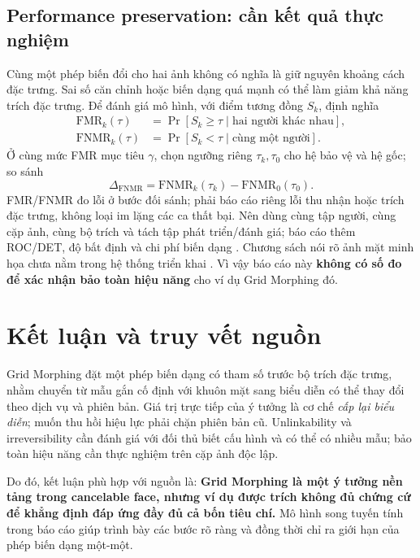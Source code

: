 \documentclass[11pt,a4paper]{article}
\begin{document}
\subsection{Performance preservation: cần kết quả thực nghiệm}
Cùng một phép biến đổi cho hai ảnh không có nghĩa là giữ nguyên khoảng cách đặc trưng. Sai số căn chỉnh hoặc biến dạng quá mạnh có thể làm giảm khả năng trích đặc trưng. Để đánh giá mô hình, với điểm tương đồng $S_k$, định nghĩa
\begin{align}
 \mathrm{FMR}_k(\tau)&=\Pr[S_k\geq\tau\mid\text{hai người khác nhau}],\\
 \mathrm{FNMR}_k(\tau)&=\Pr[S_k<\tau\mid\text{cùng một người}].
\end{align}
Ở cùng mức FMR mục tiêu $\gamma$, chọn ngưỡng riêng $\tau_k,\tau_0$ cho hệ bảo vệ và hệ gốc; so sánh
\begin{equation}
 \Delta_{\mathrm{FNMR}}=
 \mathrm{FNMR}_k(\tau_k)-\mathrm{FNMR}_0(\tau_0).
\end{equation}
FMR/FNMR đo lỗi ở bước đối sánh; phải báo cáo riêng lỗi thu nhận hoặc trích đặc trưng, không loại im lặng các ca thất bại. Nên dùng cùng tập người, cùng cặp ảnh, cùng bộ trích và tách tập phát triển/đánh giá; báo cáo thêm ROC/DET, độ bất định và chi phí biến dạng \cite{iso30136}. Chương sách nói rõ ảnh mặt minh họa chưa nằm trong hệ thống triển khai \cite[tr.~394]{adler}. Vì vậy báo cáo này \textbf{không có số đo để xác nhận bảo toàn hiệu năng} cho ví dụ Grid Morphing đó.

\newpage
\section{Kết luận và truy vết nguồn}
Grid Morphing đặt một phép biến dạng có tham số trước bộ trích đặc trưng, nhằm chuyển từ mẫu gắn cố định với khuôn mặt sang biểu diễn có thể thay đổi theo dịch vụ và phiên bản. Giá trị trực tiếp của ý tưởng là cơ chế \emph{cấp lại biểu diễn}; muốn thu hồi hiệu lực phải chặn phiên bản cũ. Unlinkability và irreversibility cần đánh giá với đối thủ biết cấu hình và có thể có nhiều mẫu; bảo toàn hiệu năng cần thực nghiệm trên cặp ảnh độc lập.

Do đó, kết luận phù hợp với nguồn là: \textbf{Grid Morphing là một ý tưởng nền tảng trong cancelable face, nhưng ví dụ được trích không đủ chứng cứ để khẳng định đáp ứng đầy đủ cả bốn tiêu chí.} Mô hình song tuyến tính trong báo cáo giúp trình bày các bước rõ ràng và đồng thời chỉ ra giới hạn của phép biến dạng một-một.
\end{document}
